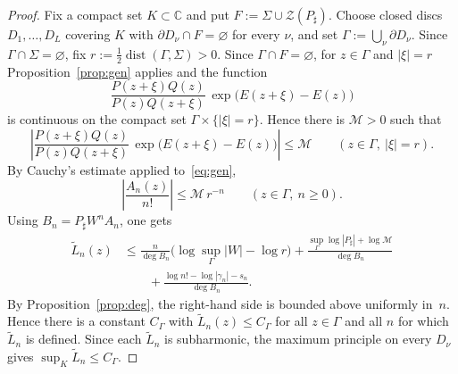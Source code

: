 \documentclass[reqno]{article}
\theoremstyle{definition}
\theoremstyle{remark}
\theoremstyle{plain}
\newcommand{\C}{\mathbb C}
\newcommand{\Z}{\mathcal Z}
\begin{document}
\begin{proof}
Fix a compact set $K\subset\C$ and put $F:=\Sigma\cup \Z(P_\sharp)$. Choose closed discs $D_1,\dots,D_L$ covering $K$ with $\partial D_\nu\cap F=\varnothing$ for every $\nu$, and set $\Gamma:=\bigcup_\nu\partial D_\nu$. Since $\Gamma\cap\Sigma=\varnothing$, fix $r:=\tfrac12\operatorname{dist}(\Gamma,\Sigma)>0$. Since $\Gamma\cap F=\varnothing$, for $z\in\Gamma$ and $|\xi|=r$ Proposition~\ref{prop:gen} applies and the function
$$\frac{P(z+\xi)Q(z)}{P(z)Q(z+\xi)}\,\exp\!\bigl(E(z+\xi)-E(z)\bigr)$$
is continuous on the compact set $\Gamma\times\{|\xi|=r\}$. Hence there is $\mathcal M>0$ such that
$$\left|\frac{P(z+\xi)Q(z)}{P(z)Q(z+\xi)}\,\exp\!\bigl(E(z+\xi)-E(z)\bigr)\right|\le\mathcal M\qquad(z\in\Gamma,\ |\xi|=r).$$
By Cauchy's estimate applied to~\eqref{eq:gen},
$$\left|\frac{A_n(z)}{n!}\right|\le\mathcal M\,r^{-n}\qquad(z\in\Gamma,\ n\ge0).$$
Using $B_n=P_\sharp W^n A_n$, one gets
\begin{align*}
\widetilde L_n(z)
&\le\frac{n}{\deg B_n}\bigl(\log\sup_\Gamma|W|-\log r\bigr)+\frac{\sup_\Gamma\log|P_\sharp|+\log\mathcal M}{\deg B_n}\\
&\qquad+\frac{\log n!-\log|\gamma_n|-s_n}{\deg B_n}.
\end{align*}
By Proposition~\ref{prop:deg}, the right-hand side is bounded above uniformly in~$n$. Hence there is a constant $C_\Gamma$ with $\widetilde L_n(z)\le C_\Gamma$ for all $z\in\Gamma$ and all $n$ for which $\widetilde L_n$ is defined. Since each $\widetilde L_n$ is subharmonic, the maximum principle on every $D_\nu$ gives $\sup_K\widetilde L_n\le C_\Gamma$.
\end{proof}
\end{document}
